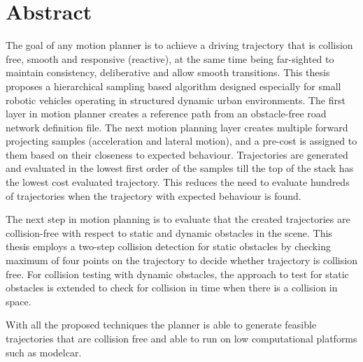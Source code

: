 \chapter*{Abstract}
The goal of any motion planner is to achieve a driving trajectory that is collision free, smooth and responsive (reactive), at the same time being far-sighted to maintain consistency, deliberative and allow smooth transitions. This thesis proposes a hierarchical sampling based algorithm designed especially for small robotic vehicles operating in structured dynamic urban environments. The first layer in motion planner creates a reference path from an obstacle-free road network definition file. The next motion planning layer creates multiple forward projecting samples (acceleration and lateral motion), and a pre-cost is assigned to them based on their closeness to expected behaviour. Trajectories are generated and evaluated in the lowest first order of the samples till the top of the stack has the lowest cost evaluated trajectory. This reduces the need to evaluate hundreds of trajectories when the trajectory with expected behaviour is found. 

The next step in motion planning is to evaluate that the created trajectories are collision-free with respect to static and dynamic obstacles in the scene. This thesis employs a two-step collision detection for static obstacles by checking maximum of four points on the trajectory to decide whether trajectory is collision free. For collision testing with dynamic obstacles, the approach to test for static obstacles is extended to check for collision in time when there is a collision in space. 

With all the proposed techniques the planner is able to generate feasible trajectories that are collision free and able to run on low computational platforms such as modelcar. 
